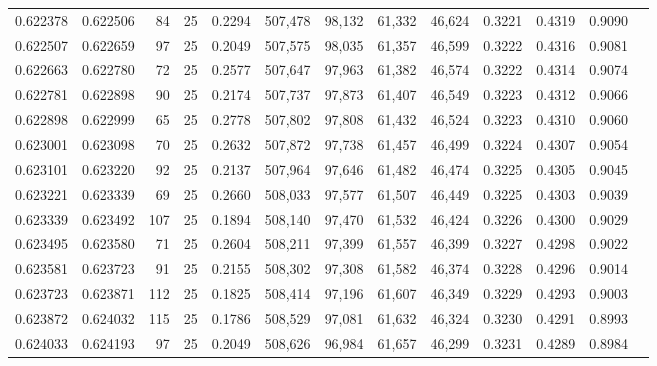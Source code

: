 \begin{tabular}{rrrrrrrrrrrrr}
0.622378 & 0.622506 &    84 &  25 &                                     0.2294 & 507,478 &  98,132 &  61,332 &  46,624 & 0.3221 & 0.4319 & 0.9090 \\
0.622507 & 0.622659 &    97 &  25 &                                     0.2049 & 507,575 &  98,035 &  61,357 &  46,599 & 0.3222 & 0.4316 & 0.9081 \\
0.622663 & 0.622780 &    72 &  25 &                                     0.2577 & 507,647 &  97,963 &  61,382 &  46,574 & 0.3222 & 0.4314 & 0.9074 \\
0.622781 & 0.622898 &    90 &  25 &                                     0.2174 & 507,737 &  97,873 &  61,407 &  46,549 & 0.3223 & 0.4312 & 0.9066 \\
0.622898 & 0.622999 &    65 &  25 &                                     0.2778 & 507,802 &  97,808 &  61,432 &  46,524 & 0.3223 & 0.4310 & 0.9060 \\
0.623001 & 0.623098 &    70 &  25 &                                     0.2632 & 507,872 &  97,738 &  61,457 &  46,499 & 0.3224 & 0.4307 & 0.9054 \\
0.623101 & 0.623220 &    92 &  25 &                                     0.2137 & 507,964 &  97,646 &  61,482 &  46,474 & 0.3225 & 0.4305 & 0.9045 \\
0.623221 & 0.623339 &    69 &  25 &                                     0.2660 & 508,033 &  97,577 &  61,507 &  46,449 & 0.3225 & 0.4303 & 0.9039 \\
0.623339 & 0.623492 &   107 &  25 &                                     0.1894 & 508,140 &  97,470 &  61,532 &  46,424 & 0.3226 & 0.4300 & 0.9029 \\
0.623495 & 0.623580 &    71 &  25 &                                     0.2604 & 508,211 &  97,399 &  61,557 &  46,399 & 0.3227 & 0.4298 & 0.9022 \\
0.623581 & 0.623723 &    91 &  25 &                                     0.2155 & 508,302 &  97,308 &  61,582 &  46,374 & 0.3228 & 0.4296 & 0.9014 \\
0.623723 & 0.623871 &   112 &  25 &                                     0.1825 & 508,414 &  97,196 &  61,607 &  46,349 & 0.3229 & 0.4293 & 0.9003 \\
0.623872 & 0.624032 &   115 &  25 &                                     0.1786 & 508,529 &  97,081 &  61,632 &  46,324 & 0.3230 & 0.4291 & 0.8993 \\
0.624033 & 0.624193 &    97 &  25 &                                     0.2049 & 508,626 &  96,984 &  61,657 &  46,299 & 0.3231 & 0.4289 & 0.8984 \\

\end{tabular}
